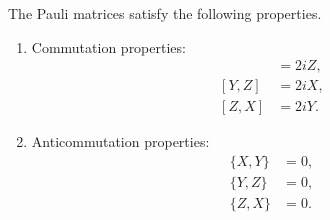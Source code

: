 \documentclass{article}
\begin{document}
  \begin{theorem}
    The Pauli matrices satisfy the following properties. 
    \begin{enumerate}
      \item Commutation properties: 
        \begin{align} 
          [X, Y] & = 2iZ, \\
          [Y, Z] & = 2iX, \\
          [Z, X] & = 2iY.
        \end{align}

      \item Anticommutation properties: 
        \begin{align} 
          \{X, Y\} & = 0, \\
          \{Y, Z\} & = 0, \\
          \{Z, X\} & = 0.
        \end{align}
    \end{enumerate}
  \end{theorem}
\end{document}
